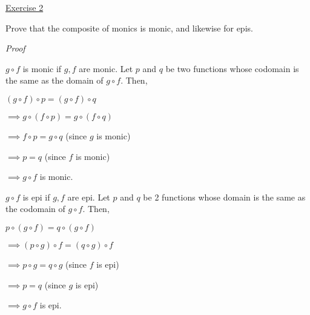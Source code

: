 \noindent
\underline{Exercise 2}
\vspace{2mm}

Prove that the composite of monics is monic, and likewise for epis.

\vspace{2mm}

\noindent
\emph{Proof}

$g \circ f$ is monic if $g, f$ are monic. Let $p$ and $q$ be two functions whose codomain is the same as the domain of $g \circ f$. Then, 

$(g \circ f) \circ p = (g \circ f) \circ q$

$\implies g \circ (f \circ p) = g \circ (f \circ q)$

$\implies f \circ p = g \circ q$ (since $g$ is monic)

$\implies p = q$ (since $f$ is monic)

$\implies g \circ f$ is monic.


$g \circ f$ is epi if $g, f$ are epi. Let $p$ and $q$ be 2 functions whose domain is the same as the codomain of $g \circ f$. Then,

$p \circ (g \circ f) = q \circ (g \circ f)$

$\implies (p \circ g) \circ f = (q \circ g) \circ f$

$\implies p \circ g = q \circ g$ (since $f$ is epi)

$\implies p = q$ (since $g$ is epi)

$\implies g \circ f$ is epi.

\vspace{2mm}
